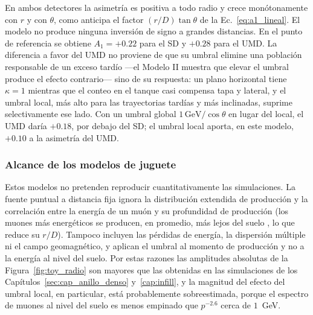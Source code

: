 En ambos detectores la asimetría es positiva a todo radio y crece monótonamente con $r$ y con $\theta$, como anticipa el factor $(r/D)\tan\theta$ de la Ec.~\ref{eq:a1_lineal}. El modelo no produce ninguna inversión de signo a grandes distancias. En el punto de referencia se obtiene $A_1 = +0.22$ para el SD y $+0.28$ para el UMD. La diferencia a favor del UMD no proviene de que su umbral elimine una población responsable de un exceso tardío ---el Modelo II muestra que elevar el umbral produce el efecto contrario--- sino de su respuesta: un plano horizontal tiene $\kappa=1$ mientras que el conteo en el tanque casi compensa tapa y lateral, y el umbral local, más alto para las trayectorias tardías y más inclinadas, suprime selectivamente ese lado. Con un umbral global $1\,\mathrm{GeV}/\cos\theta$ en lugar del local, el UMD daría $+0.18$, por debajo del SD; el umbral local aporta, en este modelo, $+0.10$ a la asimetría del UMD.

\subsubsection{Alcance de los modelos de juguete}
\label{subsubsec:toy_alcance}

Estos modelos no pretenden reproducir cuantitativamente las simulaciones. La fuente puntual a distancia fija ignora la distribución extendida de producción y la correlación entre la energía de un muón y su profundidad de producción (los muones más energéticos se producen, en promedio, más lejos del suelo \cite{Cazon2012}, lo que reduce su $r/D$). Tampoco incluyen las pérdidas de energía, la dispersión múltiple ni el campo geomagnético, y aplican el umbral al momento de producción y no a la energía al nivel del suelo. Por estas razones las amplitudes absolutas de la Figura~\ref{fig:toy_radio} son mayores que las obtenidas en las simulaciones de los Capítulos~\ref{sec:cap_anillo_denso} y~\ref{cap:infill}, y la magnitud del efecto del umbral local, en particular, está probablemente sobreestimada, porque el espectro de muones al nivel del suelo es menos empinado que $p^{-2.6}$ cerca de $1$~GeV.

